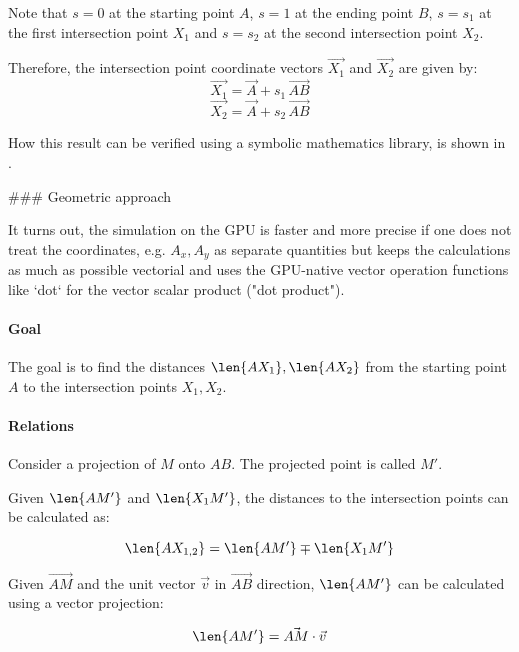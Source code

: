 Note that $s = 0$ at the starting point $A$, $s = 1$ at the ending point $B$, $s = s_1$ at the first intersection point $X_1$ and $s = s_2$ at the second intersection point $X_2$.

Therefore, the intersection point coordinate vectors $\vec{X_1}$ and $\vec{X_2}$ are given by:
\begin{equation}
  \vec{X_1} = \vec{A} + s_1 \, \vec{AB}
\end{equation}
\begin{equation}
  \vec{X_2} = \vec{A} + s_2 \, \vec{AB}
\end{equation}

How this result can be verified using a symbolic mathematics library, is shown in .


### Geometric approach

It turns out, the simulation on the GPU is faster and more precise if one does not treat the coordinates, e.g. $A_x, A_y$ as separate quantities but keeps the calculations as much as possible vectorial and uses the GPU-native vector operation functions like `dot` for the vector scalar product ("dot product").


\paragraph{Goal} The goal is to find the distances $\len{AX_1}, \len{AX_2}$ from the starting point $A$ to the intersection points $X_1, X_2$.

\paragraph{Relations}

Consider a projection of $M$ onto $AB$. The projected point is called $M'$.

Given $\len{A M'}$ and $\len{X_1 M'}$, the distances to the intersection points can be calculated as:

\begin{equation} \len{A X_{1,2}} = \len{A M'} \mp \len{X_1 M'} \end{equation}

Given $\vec{AM}$ and the unit vector $\vec{v}$ in $\vec{AB}$ direction, $\len{AM'}$ can be calculated using a vector projection:

\begin{equation} \len{AM'} = \vec{AM} \cdot \vec{v} \end{equation}

